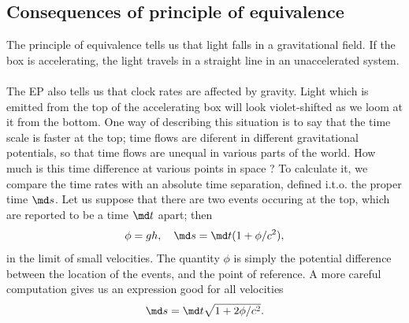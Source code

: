 \subsection{Consequences of principle of equivalence}
The principle of equivalence tells us that light falls in a gravitational field. If the box is accelerating, the light travels in a straight line in an unaccelerated system.\\
\\
The EP also tells us that clock rates are affected by gravity. Light which is emitted from the top of the accelerating box will look violet-shifted as we loom at it from the bottom. One way of describing this situation is to say that the time scale is faster at the top; time flows are diferent in different gravitational potentials, so that time flows are unequal in various parts of the world. How much is this time difference at various points in space ? To calculate it, we compare the time rates with an absolute time separation, defined i.t.o. the proper time $\md s$. Let us suppose that there are two events occuring at the top, which are reported to be a time $\md t$ apart; then
\begin{equation}
\phi = g h, \quad \md s = \md t(1 + \phi/c^2),
\end{equation}
in the limit of small velocities. The quantity $\phi$ is simply the potential difference between the location of the events, and the point of reference. A more careful computation gives us an expression good for all velocities 
\begin{equation}
\md s = \md t \sqrt{1+2 \phi/c^2}.
\end{equation}
\\
\\
